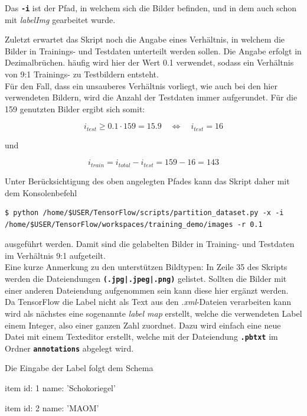 \documentclass[12pt, oneside]{article}
\begin{document}
Das \textbf{\texttt{-i}} ist der Pfad, in welchem sich die Bilder befinden, und in dem auch schon mit \textit{labelImg} gearbeitet wurde.

Zuletzt erwartet das Skript noch die Angabe eines Verhältnis, in welchem die Bilder in Trainings- und Testdaten unterteilt werden sollen. Die Angabe erfolgt in Dezimalbrüchen. häufig wird hier der Wert 0.1 verwendet, sodass ein Verhältnis von 9:1 Trainings- zu Testbildern entsteht.\\

Für den Fall, dass ein unsauberes Verhältnis vorliegt, wie auch bei den hier verwendeten Bildern, wird die Anzahl der Testdaten immer aufgerundet. Für die 159 genutzten Bilder ergibt sich somit:

\[i_{test} \geq 0.1 \cdot 159 = 15.9\quad\iff\quad i_{test}=16\]

und

\[i_{train} = i_{total} - i_{test} = 159-16=143\]

Unter Berücksichtigung des oben angelegten Pfades kann das Skript daher mit dem Konsolenbefehl

\begin{verbatim}
$ python /home/$USER/TensorFlow/scripts/partition_dataset.py -x -i /home/$USER/TensorFlow/workspaces/training_demo/images -r 0.1
\end{verbatim}
ausgeführt werden. Damit sind die gelabelten Bilder in Training- und Testdaten im Verhältnis 9:1 aufgeteilt.\\

Eine kurze Anmerkung zu den unterstützen Bildtypen: In Zeile 35 des Skripts werden die Dateiendungen \textbf{\texttt{(.jpg|.jpeg|.png)}} gelistet. Sollten die Bilder mit einer anderen Dateiendung aufgenommen sein kann diese hier ergänzt werden.\\

Da TensorFlow die Label nicht als Text aus den \textit{.xml}-Dateien verarbeiten kann wird als nächstes eine sogenannte \textit{label map} erstellt, welche die verwendeten Label einem Integer, also einer ganzen Zahl zuordnet. Dazu wird einfach eine neue Datei mit einem Texteditor erstellt, welche mit der Dateiendung \textbf{\texttt{.pbtxt}} im Ordner \textbf{\texttt{annotations}} abgelegt wird.

Die Eingabe der Label folgt dem Schema

\begin{python}
item {
	id: 1
	name: 'Schokoriegel'
}

item {
	id: 2
	name: 'MAOM'
}    
\end{python}
\end{document}
